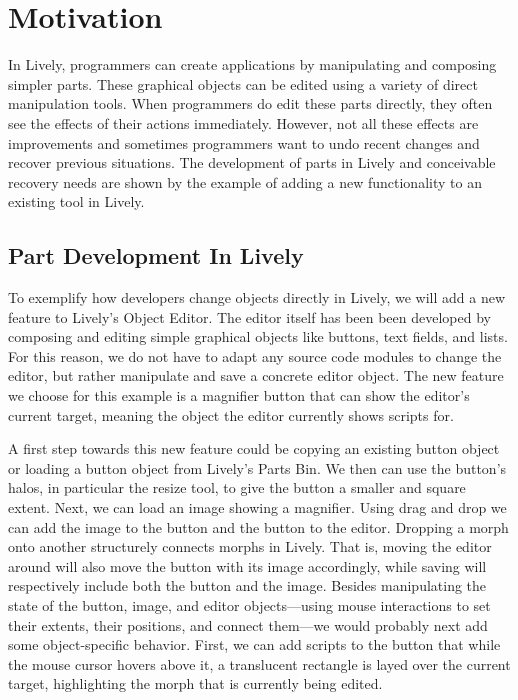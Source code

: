 \chapter{Motivation} \label{chapter:MOTIVATION}

In Lively, programmers can create applications by manipulating and composing simpler parts.
These graphical objects can be edited using a variety of direct manipulation tools.
When programmers do edit these parts directly, they often see the effects of their actions immediately.
However, not all these effects are improvements and sometimes programmers want to undo recent changes and recover previous situations.
The development of parts in Lively and conceivable recovery needs are shown by the example of adding a new functionality to an existing tool in Lively.


\section{Part Development In Lively}

To exemplify how developers change objects directly in Lively, we will add a new feature to Lively's Object Editor.
The editor itself has been been developed by composing and editing simple graphical objects like buttons, text fields, and lists.
For this reason, we do not have to adapt any source code modules to change the editor, but rather manipulate and save a concrete editor object.
The new feature we choose for this example is a magnifier button that can show the editor's current target, meaning the object the editor currently shows scripts for.

A first step towards this new feature could be copying an existing button object or loading a button object from Lively's Parts Bin.
We then can use the button's halos, in particular the resize tool, to give the button a smaller and square extent.
Next, we can load an image showing a magnifier.
Using drag and drop we can add the image to the button and the button to the editor.
Dropping a morph onto another structurely connects morphs in Lively.
That is, moving the editor around will also move the button with its image accordingly, while saving will respectively include both the button and the image.
Besides manipulating the state of the button, image, and editor objects---using mouse interactions to set their extents, their positions, and connect them---we would probably next add some object-specific behavior.
First, we can add scripts to the button that while the mouse cursor hovers above it, a translucent rectangle is layed over the current target, highlighting the morph that is currently being edited.

